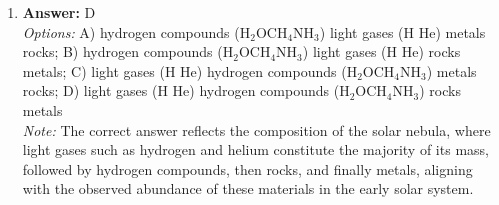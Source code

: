 \documentclass[12pt]{article}
\begin{document}
\begin{enumerate}[label=\arabic*.]
\\ \textit{Note:} A terrestrial planet requires both a molten metallic core to facilitate the dynamo effect that generates a magnetic field and reasonably fast rotation to enhance this dynamo action, resulting in a strong magnetic field.
\item \textbf{Answer:} D
\\ \textit{Options:} A) hydrogen compounds (H$_{2}$OCH$_{4}$NH$_{3}$) light gases (H He) metals rocks; B) hydrogen compounds (H$_{2}$OCH$_{4}$NH$_{3}$) light gases (H He) rocks metals; C) light gases (H He) hydrogen compounds (H$_{2}$OCH$_{4}$NH$_{3}$) metals rocks; D) light gases (H He) hydrogen compounds (H$_{2}$OCH$_{4}$NH$_{3}$) rocks metals
\\ \textit{Note:} The correct answer reflects the composition of the solar nebula, where light gases such as hydrogen and helium constitute the majority of its mass, followed by hydrogen compounds, then rocks, and finally metals, aligning with the observed abundance of these materials in the early solar system.
\end{enumerate}
\end{document}
